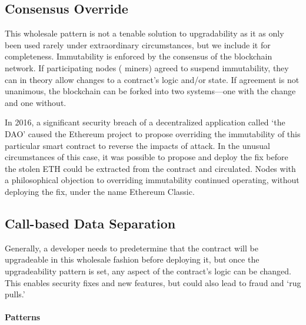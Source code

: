 
\subsection{Consensus Override}
\label{sec:hardfork}

This wholesale pattern is not a tenable solution to upgradability as it as only been used rarely under extraordinary circumstances, but we include it for completeness. Immutability is enforced by the consensus of the blockchain network. If participating nodes (
\eg miners) agreed to suspend immutability, they can in theory allow changes to a contract's logic and/or state. If agreement is not unanimous, the blockchain can be forked into two systems---one with the change and one without. 

In 2016, a significant security breach of a decentralized application called `the DAO' caused the Ethereum project to propose overriding the immutability of this particular smart contract to reverse the impacts of attack. In the unusual circumstances of this case, it was possible to propose and deploy the fix before the stolen ETH could be extracted from the contract and circulated. Nodes with a philosophical objection to overriding immutability continued operating, without deploying the fix, under the name Ethereum Classic.




\subsection{Call-based Data Separation}

 Generally, a developer needs to predetermine that the contract will be upgradeable in this wholesale fashion before deploying it, but once the upgradeability pattern is set, any aspect of the contract's logic can be changed. This enables security fixes and new features, but could also lead to fraud and `rug pulls.'


\paragraph{ Patterns}


